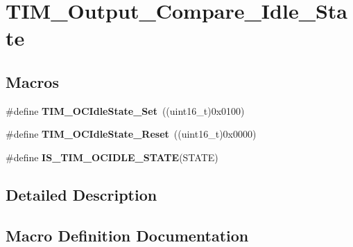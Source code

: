 \hypertarget{group___t_i_m___output___compare___idle___state}{}\section{T\+I\+M\+\_\+\+Output\+\_\+\+Compare\+\_\+\+Idle\+\_\+\+State}
\label{group___t_i_m___output___compare___idle___state}
\subsection*{Macros}
\begin{DoxyCompactItemize}
\item 
\hypertarget{group___t_i_m___output___compare___idle___state_ga86d8f895a1ec584323f6c02c7edfad4c}{}\#define {\bfseries T\+I\+M\+\_\+\+O\+C\+Idle\+State\+\_\+\+Set}~((uint16\+\_\+t)0x0100)\label{group___t_i_m___output___compare___idle___state_ga86d8f895a1ec584323f6c02c7edfad4c}

\item 
\hypertarget{group___t_i_m___output___compare___idle___state_gace5465bc9e90ba7862b3af9e6cc9b97e}{}\#define {\bfseries T\+I\+M\+\_\+\+O\+C\+Idle\+State\+\_\+\+Reset}~((uint16\+\_\+t)0x0000)\label{group___t_i_m___output___compare___idle___state_gace5465bc9e90ba7862b3af9e6cc9b97e}

\item 
\#define {\bfseries I\+S\+\_\+\+T\+I\+M\+\_\+\+O\+C\+I\+D\+L\+E\+\_\+\+S\+T\+A\+T\+E}(S\+T\+A\+T\+E)
\end{DoxyCompactItemize}


\subsection{Detailed Description}


\subsection{Macro Definition Documentation}
\hypertarget{group___t_i_m___output___compare___idle___state_ga69c62dcc15f9d39108b19b64205d689e}{}
